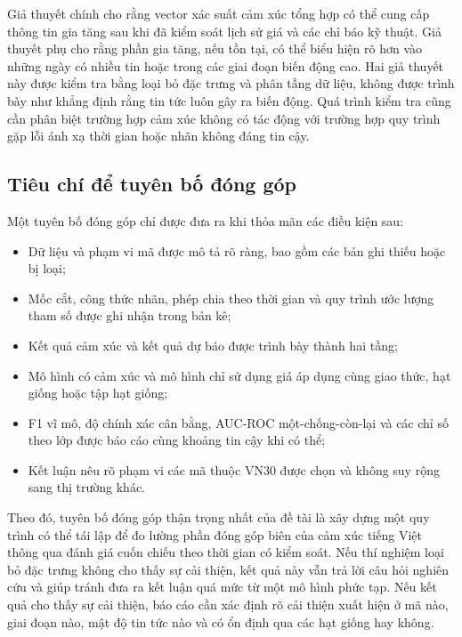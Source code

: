 \documentclass[12pt, a4paper, oneside]{report}
\begin{document}
Giả thuyết chính cho rằng vector xác suất cảm xúc tổng hợp có thể cung cấp thông tin gia
tăng sau khi đã kiểm soát lịch sử giá và các chỉ báo kỹ thuật. Giả thuyết phụ cho rằng phần gia
tăng, nếu tồn tại, có thể biểu hiện rõ hơn vào những ngày có nhiều tin hoặc trong các giai đoạn biến động
cao. Hai giả thuyết này được kiểm tra bằng loại bỏ đặc trưng và phân tầng dữ liệu, không được
trình bày như khẳng định rằng tin tức luôn gây ra biến động. Quá trình kiểm tra cũng cần
phân biệt trường hợp cảm xúc không có tác động với trường hợp quy trình gặp lỗi ánh
xạ thời gian hoặc nhãn không đáng tin cậy.

\subsection{Tiêu chí để tuyên bố đóng góp}

Một tuyên bố đóng góp chỉ được đưa ra khi thỏa mãn các điều kiện sau:

\begin{itemize}[nosep]
  \item Dữ liệu và phạm vi mã được mô tả rõ ràng, bao gồm các bản ghi thiếu hoặc bị loại;
  \item Mốc cắt, công thức nhãn, phép chia theo thời gian và quy trình ước lượng tham số được
    ghi nhận trong bản kê;
  \item Kết quả cảm xúc và kết quả dự báo được trình bày thành hai tầng;
  \item Mô hình có cảm xúc và mô hình chỉ sử dụng giá áp dụng cùng giao thức, hạt giống hoặc tập hạt giống;
  \item F1 vĩ mô, độ chính xác cân bằng, AUC-ROC một-chống-còn-lại và các chỉ số theo lớp được báo cáo
    cùng khoảng tin cậy khi có thể;
  \item Kết luận nêu rõ phạm vi các mã thuộc VN30 được chọn và không suy rộng sang thị
    trường khác.
\end{itemize}

Theo đó, tuyên bố đóng góp thận trọng nhất của đề tài là xây dựng một quy trình có thể tái lập để đo lường phần
đóng góp biên của cảm xúc tiếng Việt thông qua đánh giá cuốn chiếu theo thời gian có kiểm soát. Nếu
thí nghiệm loại bỏ đặc trưng không cho thấy sự cải thiện, kết quả này vẫn trả lời câu hỏi nghiên cứu và giúp
tránh đưa ra kết luận quá mức từ một mô hình phức tạp. Nếu kết quả cho thấy sự cải thiện, báo cáo cần
xác định rõ cải thiện xuất hiện ở mã nào, giai đoạn nào, mật độ tin tức nào và có ổn định
qua các hạt giống hay không.
\end{document}
